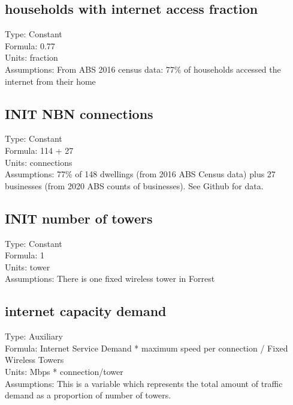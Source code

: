 \documentclass[
  11pt,
]{book}
\begin{document}
\hypertarget{households-with-internet-access-fraction}{%
\subsection{households with internet access fraction}\label{households-with-internet-access-fraction}}

Type: Constant\\
Formula: 0.77\\
Units: fraction\\
Assumptions: From ABS 2016 census data: 77\% of households accessed the internet from their home

\hypertarget{init-nbn-connections}{%
\subsection{INIT NBN connections}\label{init-nbn-connections}}

Type: Constant\\
Formula: 114 + 27\\
Units: connections\\
Assumptions: 77\% of 148 dwellings (from 2016 ABS Census data) plus 27 businesses (from 2020 ABS counts of businesses). See Github for data.

\hypertarget{init-number-of-towers}{%
\subsection{INIT number of towers}\label{init-number-of-towers}}

Type: Constant\\
Formula: 1\\
Units: tower\\
Assumptions: There is one fixed wireless tower in Forrest

\hypertarget{internet-capacity-demand}{%
\subsection{internet capacity demand}\label{internet-capacity-demand}}

Type: Auxiliary\\
Formula: Internet Service Demand * maximum speed per connection / Fixed Wireless Towers\\
Units: Mbps * connection/tower\\
Assumptions: This is a variable which represents the total amount of traffic demand as a proportion of number of towers.
\end{document}
